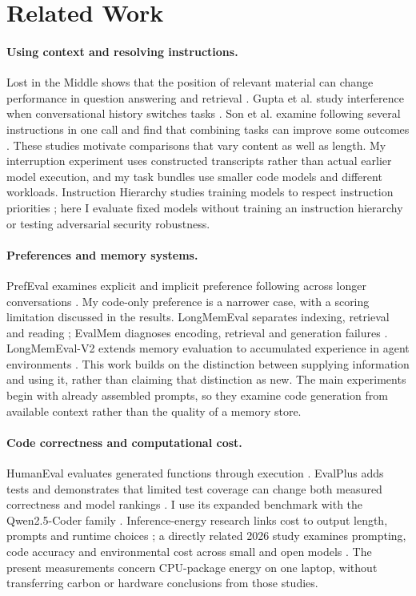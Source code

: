 \documentclass[10pt,a4paper,twocolumn]{article}
\begin{document}
\section{Related Work}
\paragraph{Using context and resolving instructions.}
Lost in the Middle shows that the position of relevant material can change
performance in question answering and retrieval \citep{lost}. Gupta et al.
study interference when conversational history switches tasks
\citep{interference}. Son et al. examine following several instructions in one
call and find that combining tasks can improve some outcomes \citep{multitask}.
These studies motivate comparisons that vary content as well as length.
My interruption experiment uses constructed transcripts rather than actual
earlier model execution, and my task bundles use smaller code models and
different workloads. Instruction Hierarchy studies training models to respect
instruction priorities \citep{hierarchy}; here I evaluate fixed models without
training an instruction hierarchy or testing adversarial security robustness.

\paragraph{Preferences and memory systems.}
PrefEval examines explicit and implicit preference following across longer
conversations \citep{prefeval}. My code-only preference is a narrower case,
with a scoring limitation discussed in the results. LongMemEval separates
indexing, retrieval and reading \citep{longmem}; EvalMem diagnoses encoding,
retrieval and generation failures \citep{evalmem}. LongMemEval-V2 extends memory
evaluation to accumulated experience in agent environments \citep{longmemv2}.
This work builds on the distinction between supplying information and using it,
rather than claiming that distinction as new. The main experiments begin with
already assembled prompts, so they examine code generation from available
context rather than the quality of a memory store.

\paragraph{Code correctness and computational cost.}
HumanEval evaluates generated functions through execution \citep{humaneval}.
EvalPlus adds tests and demonstrates that limited test coverage can change
both measured correctness and model rankings \citep{evalplus}. I use its
expanded benchmark with the Qwen2.5-Coder family \citep{qwen}. Inference-energy
research links cost to output length, prompts and runtime choices
\citep{sustainable}; a directly related 2026 study examines prompting, code
accuracy and environmental cost across small and open models \citep{slmenergy}.
The present measurements concern CPU-package energy on one laptop, without
transferring carbon or hardware conclusions from those studies.
\end{document}
